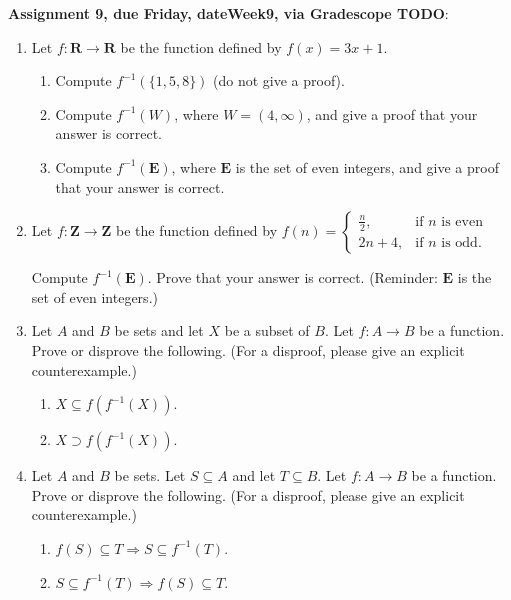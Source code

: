 \documentclass[12pt]{article}
\begin{document}
\noindent \textbf{Assignment 9, due Friday, \csname dateWeek9\endcsname, via Gradescope TODO}:
\begin{enumerate}
\item Let $f \colon \mathbf{R} \to \mathbf{R}$ be the function defined by $f(x) = 3x+1$. 
 \begin{enumerate}
 \item Compute $f^{-1}(\{1,5,8\})$ (do not give a proof).
 \item Compute $f^{-1}(W)$, where $W = (4,\infty)$, and give a proof that your answer is correct.
 \item Compute $f^{-1}(\mathbf{E})$, where $\mathbf{E}$ is the set of even integers, and give a proof that your answer is correct.
 \end{enumerate}

\item Let $f \colon \mathbf{Z} \to \mathbf{Z}$ be the function defined by $f(n) =
 \begin{cases}
 \frac{n}{2}, & \text{if $n$ is even} \\
 2n+4, & \text{if $n$ is odd}.
 \end{cases}
 $
 
 Compute $f^{-1}(\mathbf{E})$. Prove that your answer is correct. (Reminder: $\mathbf{E}$ is the set of even integers.)
\item Let $A$ and $B$ be sets and let $X$ be a subset of $B$. Let $f\colon A \to B$ be a function. Prove or disprove the following. (For a disproof, please give an explicit counterexample.)
 \begin{enumerate}
 \item $X \subseteq f(f^{-1}(X))$.
 \item $X \supset f(f^{-1}(X))$.
 \end{enumerate}

\item Let $A$ and $B$ be sets. Let $S \subseteq A$ and let $T \subseteq B$. Let $f\colon A \to B$ be a function. Prove or disprove the following. (For a disproof, please give an explicit counterexample.)
 \begin{enumerate}
 \item $f(S) \subseteq T \Rightarrow S \subseteq f^{-1}(T)$.
 \item $S \subseteq f^{-1}(T) \Rightarrow f(S) \subseteq T$.
 \end{enumerate}
 
\end{enumerate}

\newpage
\end{document}
